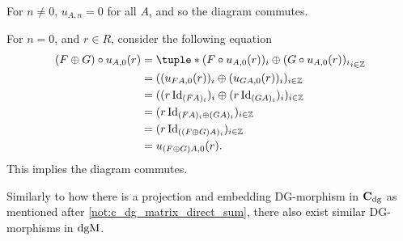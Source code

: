 \begin{remark}
\begin{itemize}
{            For \( n \neq 0 \), \( u_{A, n} = 0 \) for all \( A \), and so the diagram commutes.

            For \( n = 0 \), and \( r \in R \), consider the following equation
            \begin{align*}
                (F \oplus G) \circ u_{A, 0} (r) &= \tuple*{ (F \circ u_{A, 0} (r))_i \oplus (G \circ u_{A, 0} (r))_i }_{i \in \Zb} \\
                &= ((u_{F A, 0} (r))_i \oplus (u_{G A, 0} (r))_i)_{i \in \Zb} \\
                &= ((r \Id_{(F A)_i})_i \oplus (r \Id_{(G A)_i})_i)_{i \in \Zb} \\
                &= (r \Id_{(F A)_i \oplus (G A)_i})_{i \in \Zb} \\
                &= (r \Id_{((F \oplus G ) A)_i })_{i \in \Zb} \\
                &= u_{(F \oplus G ) A, 0} (r).
            \end{align*}
            This implies the diagram commutes.
        }
    \end{itemize}
\end{remark}

Similarly to how there is a projection and embedding DG-morphism in \( \operatorname{\mathbf{C}}_{\operatorname{dg}} \) as mentioned after \autoref{not:c_dg_matrix_direct_sum}, there also exist similar DG-morphisms in \( \operatorname{dgM} \).

